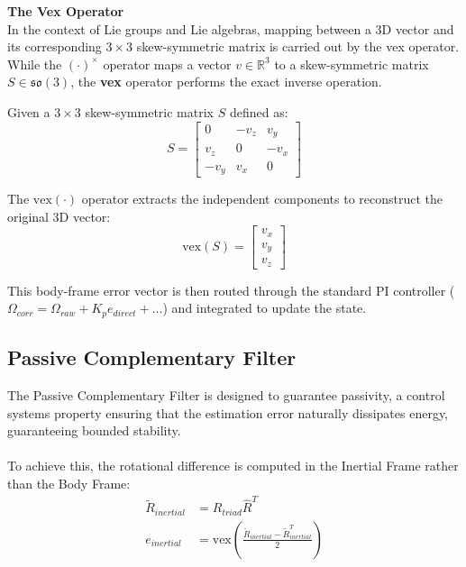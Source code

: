 \documentclass{article}
\begin{document}
\begin{mdframed}[backgroundcolor=gray!10]
    \textbf{The Vex Operator}\\
    In the context of Lie groups and Lie algebras, mapping between a 3D vector and its corresponding $3 \times 3$ skew-symmetric matrix is carried out by the vex operator. While the $(\cdot)^\times$ operator maps a vector $v \in \mathbb{R}^3$ to a skew-symmetric matrix $S \in \mathfrak{so}(3)$, the \textbf{vex} operator performs the exact inverse operation.

    Given a $3 \times 3$ skew-symmetric matrix $S$ defined as:
    \begin{equation}
    S = 
    \begin{bmatrix} 
    0 & -v_z & v_y \\ 
    v_z & 0 & -v_x \\ 
    -v_y & v_x & 0 
    \end{bmatrix}
    \end{equation}
    
    The $\text{vex}(\cdot)$ operator extracts the independent components to reconstruct the original 3D vector:
    \begin{equation}
    \text{vex}(S) = 
    \begin{bmatrix} 
    v_x \\ 
    v_y \\ 
    v_z 
    \end{bmatrix}
    \end{equation}
\end{mdframed}

This body-frame error vector is then routed through the standard PI controller ($\Omega_{corr} = \Omega_{raw} + K_p e_{direct} + \dots$) and integrated to update the state.

\subsection{Passive Complementary Filter}

The Passive Complementary Filter is designed to guarantee passivity, a control systems property ensuring that the estimation error naturally dissipates energy, guaranteeing bounded stability.\\
\\
To achieve this, the rotational difference is computed in the Inertial Frame rather than the Body Frame:
\begin{align*}
\tilde{R}_{inertial} &= R_{triad} \hat{R}^T \\
e_{inertial} &= \text{vex} \left( \frac{\tilde{R}_{inertial} - \tilde{R}_{inertial}^T}{2} \right)
\end{align*}
\end{document}
